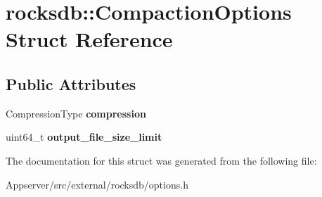 \hypertarget{structrocksdb_1_1CompactionOptions}{}\section{rocksdb\+:\+:Compaction\+Options Struct Reference}
\label{structrocksdb_1_1CompactionOptions}
\subsection*{Public Attributes}
\begin{DoxyCompactItemize}
\item 
Compression\+Type {\bfseries compression}\hypertarget{structrocksdb_1_1CompactionOptions_a315a9f172bf163fec933dc51ba53df7f}{}\label{structrocksdb_1_1CompactionOptions_a315a9f172bf163fec933dc51ba53df7f}

\item 
uint64\+\_\+t {\bfseries output\+\_\+file\+\_\+size\+\_\+limit}\hypertarget{structrocksdb_1_1CompactionOptions_a6dc9c8d555444cda47fee94d520c4a1a}{}\label{structrocksdb_1_1CompactionOptions_a6dc9c8d555444cda47fee94d520c4a1a}

\end{DoxyCompactItemize}


The documentation for this struct was generated from the following file\+:\begin{DoxyCompactItemize}
\item 
Appserver/src/external/rocksdb/options.\+h\end{DoxyCompactItemize}
